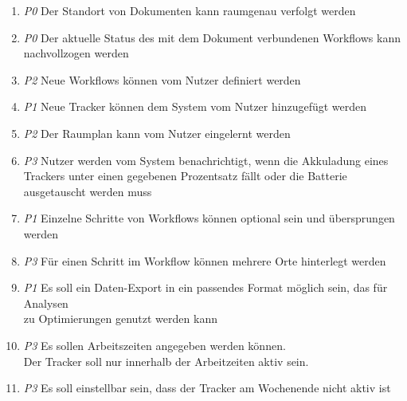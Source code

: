 \begin{enumerate}[label=\textbf{F-\arabic*}]
	\item \label{fa:tracking} \textit{P0} Der Standort von Dokumenten kann raumgenau verfolgt werden
	\item \label{fa:workflow} \textit{P0} Der aktuelle Status des mit dem Dokument verbundenen
		Workflows kann nachvollzogen werden
	\item \label{fa:neue-workflows} \textit{P2} Neue Workflows können vom Nutzer definiert werden
	\item \label{fa:neue-tracker} \textit{P1}  Neue Tracker können dem System vom Nutzer hinzugefügt werden
	\item \label{fa:raumplan} \textit{P2}  Der Raumplan kann vom Nutzer eingelernt werden
	\item \label{fa:benachrichtigung} \textit{P3} Nutzer werden vom System benachrichtigt, wenn die Akkuladung eines
	Trackers unter einen gegebenen Prozentsatz fällt oder die Batterie ausgetauscht werden muss
	\item \label{fa:optionale-schritte} \textit{P1} Einzelne Schritte von Workflows können optional sein und
	übersprungen werden
	\item \label{fa:mehrere-orte} \textit{P3}  Für einen Schritt im Workflow können mehrere Orte hinterlegt werden
	\item \label{fa:export} \textit{P1} Es soll ein Daten-Export in ein passendes Format möglich sein, das für Analysen \\
	  zu Optimierungen genutzt werden kann
	\item \label{fa:arbeitszeiten} \textit{P3} Es sollen Arbeitszeiten angegeben werden können. \\
		Der Tracker soll nur innerhalb der Arbeitzeiten aktiv sein.
	\item \label{fa:wochenende} \textit{P3} Es soll einstellbar sein, dass der Tracker am Wochenende nicht aktiv ist
\end{enumerate}


